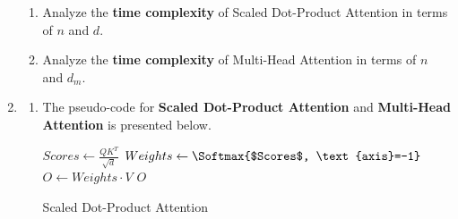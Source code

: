 \documentclass[12pt,a4paper]{article}
\makeatletter
\newtheorem*{solution}{Solution}
\theoremstyle{definition}
\renewenvironment{solution}[1][Solution] {\par\pushQED{\qed}\normalfont\topsep6\p@\@plus6\p@\relax\trivlist\item[\hskip\labelsep\bfseries#1\@addpunct{.}]\ignorespaces}{\popQED\endtrivlist\@endpefalse} \makeatother
\makeatother
\begin{document}
\begin{enumerate}
\begin{enumerate}
        \item Analyze the \textbf{time complexity} of Scaled Dot-Product Attention in terms of $n$ and $d$. 
        
        {\color{blue}{(Detailed explanation required)}}

        {\color{red}{(HINT: $d_k = d_v = d$)}}
    
        \item Analyze the \textbf{time complexity} of Multi-Head Attention in terms of $n$ and $d_{m}$. 
        
        {\color{blue}{(Detailed explanation required)}}
        
        {}
    
    \end{enumerate}

    \begin{solution}
        \begin{enumerate}
        \item 
    The pseudo-code for \textbf{Scaled Dot-Product Attention} and \textbf{Multi-Head Attention} is presented below.
    
    \begin{algorithm}[H]
    \setcounter{AlgoLine}{0}
    \BlankLine
    $Scores \leftarrow \frac{QK^T}{\sqrt{d}}$\;
    $Weights \leftarrow \Softmax{$Scores$, \text{axis}=-1}$\;
    $O \leftarrow Weights \cdot V$\;
    \Return $O$\;
    \caption{Scaled Dot-Product Attention}\label{algo_sdpa}
    \end{algorithm}
    
    \vspace{1em}
    

\end{enumerate}
\end{solution}
\end{enumerate}
\end{document}
